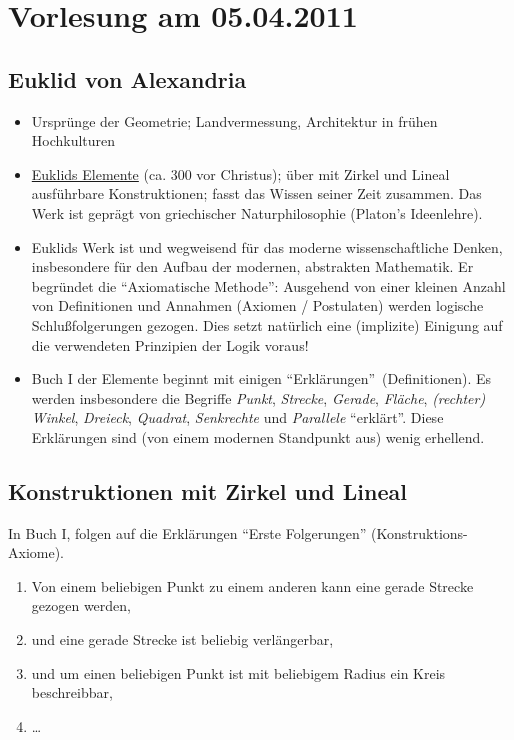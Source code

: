 \section*{Vorlesung am 05.04.2011}

\subsection*{Euklid von Alexandria}

\begin{itemize}
\item Ursprünge der Geometrie; Landvermessung, Architektur in frühen Hochkulturen
\item \href{http://www.opera-platonis.de/euklid/}{Euklids Elemente} (ca. 300 vor Christus); über mit
    Zirkel und Lineal ausführbare Konstruktionen; fasst das Wissen seiner Zeit zusammen. Das Werk
    ist geprägt von griechischer Naturphilosophie (Platon's Ideenlehre).
\item Euklids Werk ist und wegweisend für das moderne wissenschaftliche Denken, insbesondere für den
    Aufbau der modernen, abstrakten Mathematik. Er begründet die "`Axiomatische Methode"': Ausgehend
    von einer kleinen Anzahl von Definitionen und Annahmen (Axiomen / Postulaten) werden logische
    Schlußfolgerungen gezogen. Dies setzt natürlich eine (implizite) Einigung auf die verwendeten
    Prinzipien der Logik voraus!
\item Buch I der Elemente beginnt mit einigen "`Erklärungen"'\ (Definitionen). Es werden
    insbesondere die Begriffe {\em Punkt}, {\em Strecke}, {\em Gerade}, {\em Fläche}, {\em (rechter)
    Winkel}, {\em Dreieck}, {\em Quadrat}, {\em Senkrechte} und {\em Parallele} "`erklärt"'.  Diese
    Erklärungen sind (von einem modernen Standpunkt aus) wenig erhellend.
\end{itemize}

\subsection*{Konstruktionen mit Zirkel und Lineal}

In Buch I, folgen auf die Erklärungen "`Erste Folgerungen"' (Konstruktions-Axiome).

\renewcommand{\labelenumi}{\arabic{enumi}.} %
\begin{enumerate}
    \item Von einem beliebigen Punkt zu einem anderen kann eine gerade Strecke gezogen werden,
    \item und eine gerade Strecke ist beliebig verlängerbar,
    \item und um einen beliebigen Punkt ist mit beliebigem Radius ein Kreis beschreibbar,
    \item \dots
\end{enumerate}

